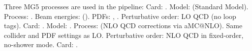 {}\markdownRendererSectionBegin
{}\markdownRendererInterblockSeparator
{}Three MG5 processes are used in the pipeline:\markdownRendererInterblockSeparator
{}\markdownRendererOlBegin
{}\markdownRendererInterblockSeparator
{}\markdownRendererUlBeginTight
\markdownRendererUlItem Card: .\markdownRendererUlItemEnd 
\markdownRendererUlItem Model:  (Standard Model).\markdownRendererUlItemEnd 
\markdownRendererUlItem Process: .\markdownRendererUlItemEnd 
\markdownRendererUlItem Beam energies:  ().\markdownRendererUlItemEnd 
\markdownRendererUlItem PDFs: , .\markdownRendererUlItemEnd 
\markdownRendererUlItem Perturbative order: LO QCD (no loop tags).\markdownRendererUlItemEnd 
\markdownRendererUlEndTight \markdownRendererOlItemEnd 
{}\markdownRendererInterblockSeparator
{}\markdownRendererUlBeginTight
\markdownRendererUlItem Card: .\markdownRendererUlItemEnd 
\markdownRendererUlItem Model: .\markdownRendererUlItemEnd 
\markdownRendererUlItem Process:  (NLO QCD corrections via aMC@NLO).\markdownRendererUlItemEnd 
\markdownRendererUlItem Same collider and PDF settings as LO.\markdownRendererUlItemEnd 
\markdownRendererUlItem Perturbative order: NLO QCD in fixed-order, no-shower mode.\markdownRendererUlItemEnd 
\markdownRendererUlEndTight \markdownRendererOlItemEnd 
{}\markdownRendererInterblockSeparator
{}\markdownRendererUlBeginTight
\markdownRendererUlItem Card: .\markdownRendererUlItemEnd 
